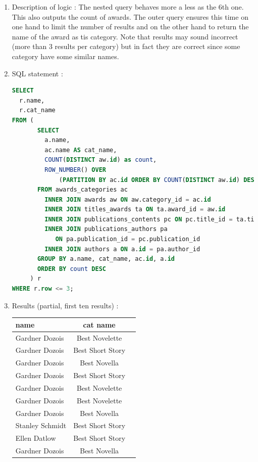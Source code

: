 \documentclass[doubleside, titlepage]{article}
\begin{document}
	\begin{enumerate}
	\item Description of logic : The nested query behaves more a less as the 6th one. This also outputs the count of awards. The outer query ensures this time on one hand to limit the number of results and on the other hand to return the name of the award as tis category. Note that results may sound incorrect (more than 3 results per category) but in fact they are correct since some category have some similar names.
	\item SQL statement :
		\begin{lstlisting}[language=SQL,showspaces=false,basicstyle=\ttfamily,numberstyle=\tiny,commentstyle=\color{gray}]
SELECT
  r.name,
  r.cat_name
FROM (
       SELECT
         a.name,
         ac.name AS cat_name,
         COUNT(DISTINCT aw.id) as count,
         ROW_NUMBER() OVER
             (PARTITION BY ac.id ORDER BY COUNT(DISTINCT aw.id) DESC) AS row
       FROM awards_categories ac
         INNER JOIN awards aw ON aw.category_id = ac.id
         INNER JOIN titles_awards ta ON ta.award_id = aw.id
         INNER JOIN publications_contents pc ON pc.title_id = ta.title_id
         INNER JOIN publications_authors pa
         	ON pa.publication_id = pc.publication_id
         INNER JOIN authors a ON a.id = pa.author_id
       GROUP BY a.name, cat_name, ac.id, a.id
       ORDER BY count DESC
     ) r
WHERE r.row <= 3;
		\end{lstlisting}

	\item Results (partial, first ten results) :\\

	\begin{tabular}{|l|c|r|}
	  \hline
		name & cat name \\
	  \hline
Gardner Dozois	& Best Novelette\\
Gardner Dozois	& Best Short Story\\
Gardner Dozois	& Best Novella\\
Gardner Dozois	& Best Short Story\\
Gardner Dozois	& Best Novelette\\
Gardner Dozois	& Best Novelette\\
Gardner Dozois	& Best Novella\\
Stanley Schmidt	& Best Short Story\\
Ellen Datlow	& Best Short Story\\
Gardner Dozois	& Best Novella\\
	  \hline
	\end{tabular}
\end{enumerate}
\end{document}
